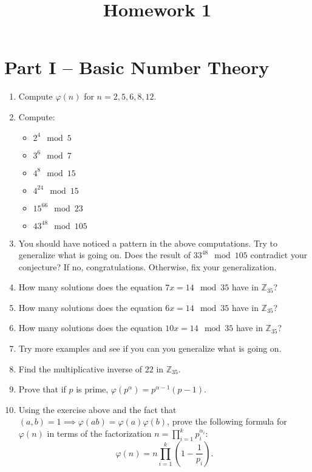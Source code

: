 \documentclass[12pt]{article}
\newcommand{\Z}{\mathbb{Z}}
\begin{document}
\title{Homework 1}
\date{}

\maketitle

\section{Part I -- Basic Number Theory} %


\begin{enumerate}
\item Compute \(\varphi(n)\) for \(n=2,5,6,8,12\).

\item Compute:
  \begin{itemize}[noitemsep]
	\item \(2^4 \mod 5\)
	\item \(3^{6} \mod 7\)
    \item \(4^{8}\mod 15\)
    \item \(4^{24}\mod 15\)
	\item \(15^{66} \mod 23\)
	\item \(43^{48} \mod 105\)
  \end{itemize}

\item You should have noticed a pattern in the above computations.  Try to
  generalize what is going on.  Does the result of \(33^{48} \mod 105\)
  contradict your conjecture?  If no, congratulations.  Otherwise, fix your
  generalization.

\item How many solutions does the equation \(7x=14\mod 35\) have in
    \(\Z_{35}\)?

\item How many solutions does the equation \(6x=14\mod 35\) have in
    \(\Z_{35}\)?

\item How many solutions does the equation \(10x=14\mod 35\) have in
    \(\Z_{35}\)?
\item Try more examples and see if you can you generalize what is going on.

\item Find the multiplicative inverse of \(22\) in \(\Z_{35}\).

\item Prove that if \(p\) is prime, \(\varphi(p^\alpha) = p^{\alpha-1}(p-1)\).

\item Using the exercise above and the fact that \((a,b)=1 \implies
  \varphi(ab) = \varphi(a)\varphi(b)\), prove the following formula for
  \(\varphi(n)\) in terms of the factorization \(n =
  \prod_{i=1}^{k}p_i^{\alpha_i}\): \[\varphi(n) = n\prod_{i=1}^{k}
  \left(1-\frac{1}{p_i}\right).\]


\end{enumerate}
\end{document}
